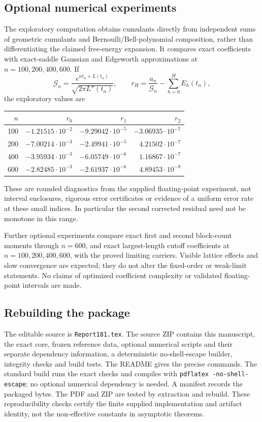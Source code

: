 \documentclass[11pt]{article}
\theoremstyle{remark}\newtheorem{remark}[theorem]{Remark}
\begin{document}
\subsection{Optional numerical experiments}
The exploratory computation obtains cumulants directly from independent sums of geometric cumulants and Bernoulli/Bell-polynomial composition, rather than differentiating the claimed free-energy expansion. It compares exact coefficients with exact-saddle Gaussian and Edgeworth approximations at $n=100,200,400,600$. If
\[
 \mathcal G_n=\frac{e^{nt_n+L(t_n)}}{\sqrt{2\pi L''(t_n)}},\qquad
 r_H=\frac{a_n}{\mathcal G_n}-\sum_{h=0}^HE_h(t_n),
\]
the exploratory values are
\begin{center}
\begin{tabular}{r r r r}
\toprule
$n$ & $r_0$ & $r_1$ & $r_2$\\
\midrule
100 & $-1.21515\cdot10^{-2}$ & $-9.29042\cdot10^{-5}$ & $-3.06935\cdot10^{-7}$\\
200 & $-7.00214\cdot10^{-3}$ & $-2.49941\cdot10^{-5}$ & $ 4.21502\cdot10^{-7}$\\
400 & $-3.95934\cdot10^{-3}$ & $-6.05749\cdot10^{-6}$ & $ 1.16867\cdot10^{-7}$\\
600 & $-2.82485\cdot10^{-3}$ & $-2.61937\cdot10^{-6}$ & $ 4.89453\cdot10^{-8}$\\
\bottomrule
\end{tabular}
\end{center}
These are rounded diagnostics from the supplied floating-point experiment, not interval enclosures, rigorous error certificates or evidence of a uniform error rate at these small indices. In particular the second corrected residual need not be monotone in this range.

Further optional experiments compare exact first and second block-count moments through $n=600$, and exact largest-length cutoff coefficients at $n=100,200,400,600$, with the proved limiting carriers. Visible lattice effects and slow convergence are expected; they do not alter the fixed-order or weak-limit statements. No claims of optimized coefficient complexity or validated floating-point intervals are made.

\subsection{Rebuilding the package}
The editable source is \texttt{Report181.tex}. The source ZIP contains this manuscript, the exact core, frozen reference data, optional numerical scripts and their separate dependency information, a deterministic no-shell-escape builder, integrity checks and build tests. The README gives the precise commands. The standard build runs the exact checks and compiles with \texttt{pdflatex -no-shell-escape}; no optional numerical dependency is needed. A manifest records the packaged bytes. The PDF and ZIP are tested by extraction and rebuild. These reproducibility checks certify the finite supplied implementation and artifact identity, not the non-effective constants in asymptotic theorems.
\end{document}
